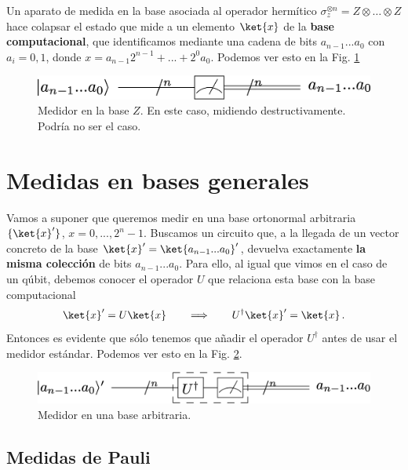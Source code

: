 \documentclass[a4paper,11pt]{book} %
\numberwithin{equation}{chapter}
\begin{document}
Un aparato de medida en la base asociada al operador hermítico $\sigma_z^{\otimes n} = Z\otimes \ldots \otimes Z$ hace colapsar el estado  que mide a un elemento $\ket{x}$ de la \textbf{base computacional}, que identificamos mediante una cadena de bits $a_{n-1}...a_0$ con $a_i=0,1$,  donde $x= a_{n-1}2^{n-1}+...+2^0 a_0$. Podemos ver esto en la Fig. \ref{Fig_medidas2_Multimeter_zbasis}

	\begin{figure}[H]
	\centering 
	\includegraphics[width=0.5\linewidth]{Figuras/Fig_medidas2_Multimeter_zbasis}
	\caption{Medidor en la base $Z$. En este caso, midiendo destructivamente. Podría no ser el caso.}
	\label{Fig_medidas2_Multimeter_zbasis}
	\end{figure}




    \section{Medidas en bases generales}
    
Vamos a suponer que queremos medir en una base ortonormal arbitraria $\{\ket{ x}'\}$, $x=0,...,2^n-1$. Buscamos un circuito que, a la llegada de un vector  concreto de la base $\ket{x}'=\ket{a_{n-1}...a_0}'$, devuelva exactamente \textbf{la misma colección} de bits  $a_{n-1}...a_0$. Para ello, al igual que vimos en el caso de un qúbit, debemos conocer el operador $U$ que relaciona esta base con la base computacional
$$
\ket{ x}'= U\ket{x}~~~~~~\Longrightarrow ~~~~~~   U^\dagger\ket{x}' = \ket{ x}  \, .
$$
Entonces es evidente que sólo tenemos que añadir el operador $U^\dagger$ antes de usar el medidor estándar. Podemos ver esto en la Fig. \ref{Fig_medidas2_Multimeter_basis}. 

	\begin{figure}[H]
	\centering 
	\includegraphics[width=0.6\linewidth]{Figuras/Fig_medidas2_Multimeter_basis}
	\caption{Medidor en una base arbitraria.}
	\label{Fig_medidas2_Multimeter_basis}
	\end{figure}


 
        \subsection{Medidas de Pauli}
\end{document}
